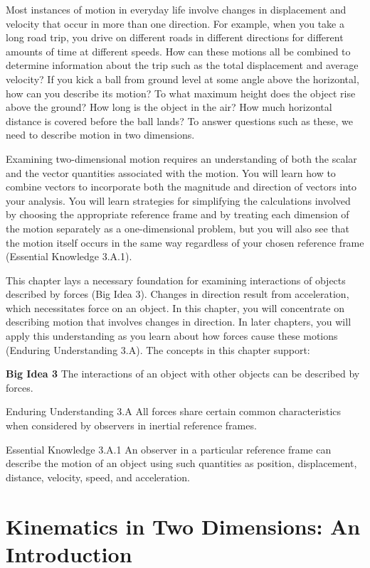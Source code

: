 \documentclass[
]{book}
\begin{document}
Most instances of motion in everyday life involve changes in
displacement and velocity that occur in more than one direction. For
example, when you take a long road trip, you drive on different roads in
different directions for different amounts of time at different speeds.
How can these motions all be combined to determine information about the
trip such as the total displacement and average velocity? If you kick a
ball from ground level at some angle above the horizontal, how can you
describe its motion? To what maximum height does the object rise above
the ground? How long is the object in the air? How much horizontal
distance is covered before the ball lands? To answer questions such as
these, we need to describe motion in two dimensions.

Examining two-dimensional motion requires an understanding of both the
scalar and the vector quantities associated with the motion. You will
learn how to combine vectors to incorporate both the magnitude and
direction of vectors into your analysis. You will learn strategies for
simplifying the calculations involved by choosing the appropriate
reference frame and by treating each dimension of the motion separately
as a one-dimensional problem, but you will also see that the motion
itself occurs in the same way regardless of your chosen reference frame
(Essential Knowledge 3.A.1).

This chapter lays a necessary foundation for examining interactions of
objects described by forces (Big Idea 3). Changes in direction result
from acceleration, which necessitates force on an object. In this
chapter, you will concentrate on describing motion that involves changes
in direction. In later chapters, you will apply this understanding as
you learn about how forces cause these motions (Enduring Understanding
3.A). The concepts in this chapter support:

\textbf{Big Idea 3} The interactions of an object with other objects can be
described by forces.

Enduring Understanding 3.A All forces share certain common
characteristics when considered by observers in inertial reference
frames.

Essential Knowledge 3.A.1 An observer in a particular reference frame
can describe the motion of an object using such quantities as position,
displacement, distance, velocity, speed, and acceleration.

\hypertarget{concept-trailer-2d-kinematics}{}

\hypertarget{kinematics-in-two-dimensions-an-introduction}{%
\section{Kinematics in Two Dimensions: An Introduction}\label{kinematics-in-two-dimensions-an-introduction}}
\end{document}
